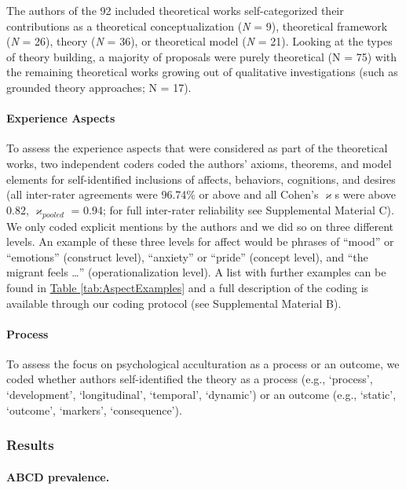 \documentclass[man, 12pt, a4paper, mask]{apa7}
\newcommand{\tblref}[2][]{\hyperref[#2]{Table \ref*{#2}#1}}
\begin{document}
The authors of the 92 included theoretical works self-categorized their
contributions as a theoretical conceptualization (\textit{N} = 9),
theoretical framework (\textit{N} = 26), theory (\textit{N} = 36), or
theoretical model (\textit{N} = 21). Looking at the types of theory
building, a majority of proposals were purely theoretical (N = 75) with
the remaining theoretical works growing out of qualitative
investigations (such as grounded theory approaches; N = 17).

\paragraph{Experience Aspects}

To assess the experience aspects that were considered as part of the
theoretical works, two independent coders coded the authors' axioms,
theorems, and model elements for self-identified inclusions of affects,
behaviors, cognitions, and desires (all inter-rater agreements were
96.74\% or above and all Cohen's \(\varkappa\)s were above 0.82,
\(\varkappa_{pooled}\) = 0.94; for full inter-rater reliability see
Supplemental Material C). We only coded explicit mentions by the authors
and we did so on three different levels. An example of these three
levels for affect would be phrases of ``mood'' or ``emotions''
(construct level), ``anxiety'' or ``pride'' (concept level), and ``the
migrant feels \ldots{}'' (operationalization level). A list with further
examples can be found in \tblref{tab:AspectExamples} and a full
description of the coding is available through our coding protocol (see
Supplemental Material B).

\paragraph{Process}

To assess the focus on psychological acculturation as a process or an
outcome, we coded whether authors self-identified the theory as a
process (e.g., `process', `development', `longitudinal', `temporal',
`dynamic') or an outcome (e.g., `static', `outcome', `markers',
`consequence').

\subsubsection{Results}

\paragraph{ABCD prevalence.}
\end{document}
